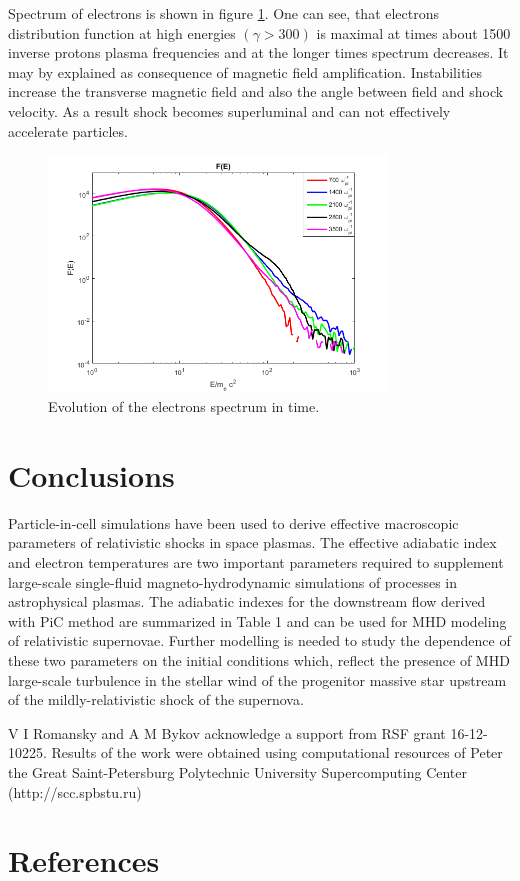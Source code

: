 \documentclass[a4paper]{jpconf}
\begin{document}
	Spectrum of electrons is shown in figure \ref{spectrum}. One can see, that electrons distribution function at high energies $(\gamma > 300)$ is maximal at times about 1500 inverse protons plasma frequencies and at the longer times spectrum decreases. It may by explained as consequence of magnetic field amplification. Instabilities increase the transverse magnetic field and also the angle between field and shock velocity. As a result shock becomes superluminal \cite{Sironi2011} and can not effectively accelerate particles.
	
	
	\begin{figure}[h!]
		\centering
		\includegraphics[width=0.8\textwidth]{fig/spectrum.png} 
		\caption{Evolution of the electrons spectrum in time.}
		\label{spectrum}
	\end{figure}
	

	
	\section{Conclusions}
	
	Particle-in-cell simulations have been used to derive effective macroscopic parameters of relativistic shocks in space plasmas. The effective adiabatic index and electron temperatures are two important parameters required to supplement large-scale single-fluid magneto-hydrodynamic simulations of processes in astrophysical plasmas. The adiabatic indexes for the downstream flow derived with PiC method are summarized in Table 1 and can be used for MHD modeling of relativistic
	supernovae. Further modelling is needed to study the dependence of these two parameters on the initial conditions which, reflect the presence of MHD large-scale turbulence in the stellar wind of the progenitor massive star upstream of the  mildly-relativistic shock of the supernova. 
	
	\ack
	V I Romansky and A M Bykov acknowledge a support from RSF grant 16-12-10225.
	Results of the work were obtained using computational resources of Peter the Great Saint-Petersburg Polytechnic University Supercomputing Center (http://scc.spbstu.ru)
	
	\section*{References}
	

	
\end{document}
